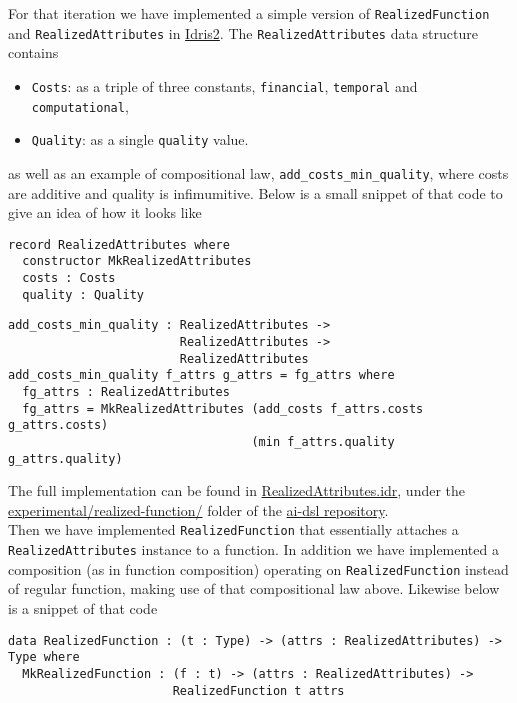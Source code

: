 \documentclass[]{report}
\newcommand{\nil}[2][]{\todo[color=purple,author=nil, #1]{#2}}
\begin{document}
For that iteration we have implemented a simple version of
\texttt{RealizedFunction} and \texttt{RealizedAttributes} in
\href{https://www.idris-lang.org/}{Idris2}.  The
\texttt{RealizedAttributes} data structure contains
\begin{itemize}
\item \texttt{Costs}: as a triple of three constants,
  \texttt{financial}, \texttt{temporal} and \texttt{computational},
\item \texttt{Quality}: as a single \texttt{quality} value.
\end{itemize}
as well as an example of compositional law,
\texttt{add\_costs\_min\_quality}, where costs are additive and
quality is infimumitive\nil{is there a word for that?}.  Below is a
small snippet of that code to give an idea of how it looks like

\begin{verbatim}
record RealizedAttributes where
  constructor MkRealizedAttributes
  costs : Costs
  quality : Quality
\end{verbatim}

\begin{verbatim}
add_costs_min_quality : RealizedAttributes ->
                        RealizedAttributes ->
                        RealizedAttributes
add_costs_min_quality f_attrs g_attrs = fg_attrs where
  fg_attrs : RealizedAttributes
  fg_attrs = MkRealizedAttributes (add_costs f_attrs.costs g_attrs.costs)
                                  (min f_attrs.quality g_attrs.quality)
\end{verbatim}
The full implementation can be found in
\href{https://github.com/singnet/ai-dsl/blob/master/experimental/realized-function/RealizedAttributes.idr}{RealizedAttributes.idr},
under the
\href{https://github.com/singnet/ai-dsl/blob/master/experimental/realized-function/}{experimental/realized-function/}
folder of the \href{https://github.com/singnet/ai-dsl/}{ai-dsl
  repository}.\\

Then we have implemented \texttt{RealizedFunction} that essentially
attaches a \texttt{RealizedAttributes} instance to a function.  In
addition we have implemented a composition (as in function
composition) operating on \texttt{RealizedFunction} instead of
regular function, making use of that compositional law above.
Likewise below is a snippet of that code

\begin{verbatim}
data RealizedFunction : (t : Type) -> (attrs : RealizedAttributes) -> Type where
  MkRealizedFunction : (f : t) -> (attrs : RealizedAttributes) ->
                       RealizedFunction t attrs
\end{verbatim}
\end{document}
